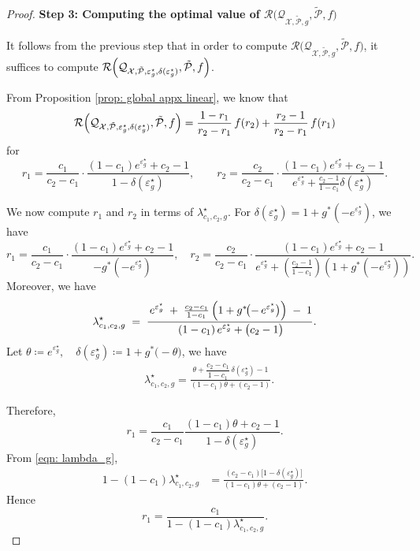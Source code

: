 \documentclass[accepted]{article}
\theoremstyle{plain} %
\theoremstyle{definition}
\theoremstyle{remark}
\begin{document}
\begin{proof}
\textbf{Step 3: Computing the optimal value of $\mathcal{R}\big(\mathcal{Q}_{\mathcal{X}, \tilde{\mathcal{P}}, g}, \tilde{\mathcal{P}}, f\big)$}

It follows from the previous step that in order to compute $\mathcal{R}\big(\mathcal{Q}_{\mathcal{X}, \tilde{\mathcal{P}}, g}, \tilde{\mathcal{P}}, f\big)$, it suffices to compute $\mathcal{R}\Bigl(\mathcal{Q}_{\mathcal{X}, \tilde{\mathcal{P}}, \varepsilon^\star_g, \delta(\varepsilon^\star_g)}, 
                    \tilde{\mathcal{P}}, f\Bigr)$.

                    From Proposition \ref{prop: global appx linear}, we know that
\[ \mathcal{R}\Bigl(\mathcal{Q}_{\mathcal{X}, \tilde{\mathcal{P}}, \varepsilon^\star_g, \delta(\varepsilon^\star_g)}, 
                    \tilde{\mathcal{P}}, f\Bigr) = \frac{1 - r_1}{r_2 - r_1} \, f(r_2) + \frac{r_2 - 1}{r_2 - r_1} \, f(r_1)\]
for
\[
    r_1 = \frac{c_1}{c_2 - c_1} \cdot \frac{(1 - c_1)e^{\varepsilon^\star_g} + c_2 - 1}{1 - \delta(\varepsilon^\star_g)},
    \qquad
    r_2 = \frac{c_2}{c_2 - c_1} \cdot \frac{(1 - c_1)e^{\varepsilon^\star_g} + c_2 - 1}{e^{\varepsilon^\star_g} + \frac{c_2 - 1}{1 - c_1} \delta(\varepsilon^\star_g)}.
    \]

    We now compute $r_1$ and $r_2$ in terms of $\lambda_{c_1,c_2,g}^\star$. For \( \delta(\varepsilon^\star_g) = 1 + g^*(-e^{\varepsilon^\star_g}) \), we have
\[
r_1 = \frac{c_1}{c_2 - c_1} \cdot 
      \frac{(1 - c_1)e^{\varepsilon^\star_g} + c_2 - 1}
           {-g^*(-e^{\varepsilon^\star_g})},
\quad
r_2 = \frac{c_2}{c_2 - c_1} \cdot 
      \frac{(1 - c_1)e^{\varepsilon^\star_g} + c_2 - 1}
           {e^{\varepsilon^\star_g} + \left(\frac{c_2 - 1}{1 - c_1}\right)\left(1 + g^*(-e^{\varepsilon^\star_g})\right)}.
\]
Moreover, we have
\[
\lambda_{c_1,c_2,g}^\star 
\;=\;
\frac{\,e^{\varepsilon^\star_g} \;+\; \tfrac{c_2 - c_1}{1 - c_1}\,\Bigl(1 + g^*\!\bigl(-\,e^{\varepsilon^\star_g}\bigr)\Bigr) \;-\; 1}
     {\,(1 - c_1)\,e^{\varepsilon^\star_g} + \bigl(c_2 - 1\bigr)}.
\]
Let $\theta \coloneqq e^{\varepsilon_g^\star},
\quad
\delta(\varepsilon_g^\star) \coloneqq 1 + g^{\!*}\!\bigl(-\theta\bigr)$, we have
\begin{align}\label{eqn: lambda_g}
&\lambda_{c_1,c_2,g}^\star
      = \frac{\theta
              + \dfrac{c_2-c_1}{1-c_1}\,\delta(\varepsilon_g^\star)
              - 1}
             {(1-c_1)\theta + (c_2-1)}.
\end{align}

Therefore,
\[
r_1
  = \frac{c_1}{c_2-c_1}
    \frac{(1-c_1)\theta + c_2 - 1}{1-\delta(\varepsilon_g^\star)}.
\]
From \eqref{eqn: lambda_g},
\begin{align*}
1-(1-c_1)\lambda_{c_1,c_2,g}^\star
  &=\frac{(c_2-c_1)\bigl[1-\delta(\varepsilon_g^\star)\bigr]}
          {(1-c_1)\theta + (c_2-1)} .
\end{align*}
Hence
\[
r_1
 = \frac{c_1}{1-(1-c_1)\lambda_{c_1,c_2,g}^\star} .
\]


\end{proof}
\end{document}
